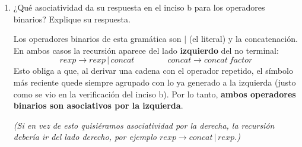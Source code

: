 \documentclass[12pt,letterpaper]{article}
\begin{document}
\begin{enumerate}[label=\arabic*.]
\begin{enumerate}[label=\alph*.]
    \textbf{Verificación.} Con esta gramática, la única derivación posible
    de $a\mid b\mid c$ es:
    \[
    \begin{aligned}
      rexp &\Rightarrow rexp\,\texttt{|}\,concat \\
      &\Rightarrow rexp\,\texttt{|}\,concat\,\texttt{|}\,concat
      \quad\text{(la única forma de generar \texttt{|} es reexpandir el $rexp$ izquierdo)}\\
      &\Rightarrow concat\,\texttt{|}\,concat\,\texttt{|}\,concat
      \quad\text{(ya no se puede seguir, usamos la base $rexp\to concat$)}\\
      &\Rightarrow^{*} a\,\texttt{|}\,concat\,\texttt{|}\,concat
      \quad(concat\Rightarrow factor\Rightarrow atom\Rightarrow letra\Rightarrow a)\\
      &\Rightarrow^{*} a\,\texttt{|}\,b\,\texttt{|}\,concat \;\Rightarrow^{*}\; a\,\texttt{|}\,b\,\texttt{|}\,c
    \end{aligned}
    \]
    En ningún paso hubo elección de \emph{cuál} $rexp$ expandir para generar el siguiente
    \texttt{|}, como la recursión solo existe del lado izquierdo ($rexp \to rexp\,\texttt{|}\,concat$),
    el único árbol posible agrupa como $(a\mid b)\mid c$. Al no existir una segunda derivación
    con árbol distinto, \textbf{la gramática ya no es ambigua}.
    
    \bigskip
    
  \item ¿Qué asociatividad da su respuesta en el inciso b para los operadores binarios?
    Explique su respuesta.
    
    Los operadores binarios de esta gramática son $\mid$ (el literal) y la concatenación. En
    ambos casos la recursión aparece del lado \textbf{izquierdo} del no terminal:
    \[
    rexp \to rexp\,\texttt{|}\,concat \qquad\qquad concat \to concat\ factor
    \]
    Esto obliga a que, al derivar una cadena con el operador repetido, el símbolo más
    reciente quede siempre agrupado con lo ya generado a la izquierda (justo como se vio en
    la verificación del inciso b). Por lo tanto, \textbf{ambos operadores binarios son
      asociativos por la izquierda}.
    
    \emph{(Si en vez de esto quisiéramos asociatividad por la derecha, la recursión debería
    ir del lado derecho, por ejemplo $rexp \to concat\,\texttt{|}\,rexp$.)}
  \end{enumerate}
  
  
\newpage


\end{enumerate}
\end{document}
